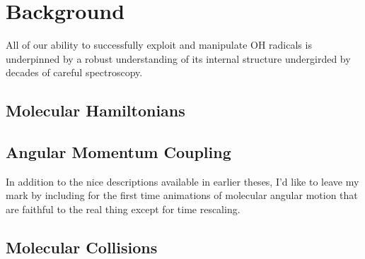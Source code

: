 \chapter{Background}
\label{chapter:Background}

All of our ability to successfully exploit and manipulate OH radicals is underpinned by a robust understanding of its internal structure undergirded by decades of careful spectroscopy.

\section{Molecular Hamiltonians}

\section{Angular Momentum Coupling}

In addition to the nice descriptions available in earlier theses, I'd like to leave my mark by including for the first time animations of molecular angular motion that are faithful to the real thing except for time rescaling.

\section{Molecular Collisions}